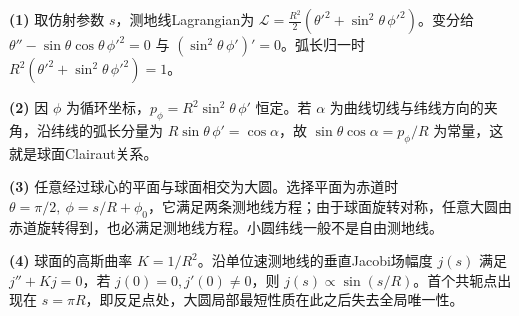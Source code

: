 \par\noindent\textbf{(1)} 取仿射参数 \(s\)，测地线Lagrangian为 \(\mathcal L=\tfrac{R^2}{2}(\theta'^2+\sin^2\theta\,\phi'^2)\)。变分给 \(\theta''-\sin\theta\cos\theta\,\phi'^2=0\) 与 \((\sin^2\theta\,\phi')'=0\)。弧长归一时 \(R^2(\theta'^2+\sin^2\theta\,\phi'^2)=1\)。
\par\noindent\textbf{(2)} 因 \(\phi\) 为循环坐标，\(p_\phi=R^2\sin^2\theta\,\phi'\) 恒定。若 \(\alpha\) 为曲线切线与纬线方向的夹角，沿纬线的弧长分量为 \(R\sin\theta\,\phi'=\cos\alpha\)，故 \(\sin\theta\cos\alpha=p_\phi/R\) 为常量，这就是球面Clairaut关系。
\par\noindent\textbf{(3)} 任意经过球心的平面与球面相交为大圆。选择平面为赤道时 \(\theta=\pi/2,\ \phi=s/R+\phi_0\)，它满足两条测地线方程；由于球面旋转对称，任意大圆由赤道旋转得到，也必满足测地线方程。小圆纬线一般不是自由测地线。
\par\noindent\textbf{(4)} 球面的高斯曲率 \(K=1/R^2\)。沿单位速测地线的垂直Jacobi场幅度 \(j(s)\) 满足 \(j''+Kj=0\)，若 \(j(0)=0,j'(0)\ne0\)，则 \(j(s)\propto\sin(s/R)\)。首个共轭点出现在 \(s=\pi R\)，即反足点处，大圆局部最短性质在此之后失去全局唯一性。
